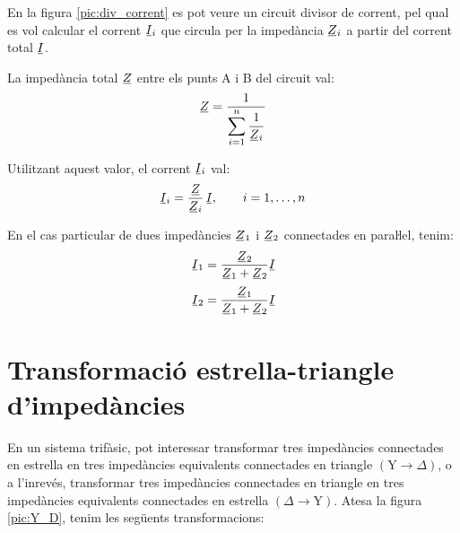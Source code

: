En la figura \vref{pic:div_corrent} es pot veure un circuit divisor
de corrent, pel qual es vol calcular el corrent $\cmplx{I}_i$ que
circula per la impedància $\cmplx{Z}_i$ a partir del corrent total
$\cmplx{I}$.
\begin{center}
	\centering
    
    \label{pic:div_corrent}
\end{center}

La impedància total $\cmplx{Z}$ entre els punts A i B del circuit val:
\begin{equation}\label{eq:z_parallel}
    \cmplx{Z} = \frac{1}{\displaystyle\sum_{i=1}^n \frac{1}{\cmplx{Z}_i}}
\end{equation}

Utilitzant aquest valor, el corrent $\cmplx{I}_i$ val:
\begin{equation}
    \cmplx{I}_i = \frac{\cmplx{Z}}{\cmplx{Z}_i}\,\cmplx{I}, \qquad i=1,\dots,n\label{eq:div_corrent}
\end{equation}

En el cas particular de dues impedàncies $\cmplx{Z}_1$ i $\cmplx{Z}_2$ connectades en paraŀlel, tenim:
\begin{subequations}
\begin{align}
    \cmplx{I}_1 &= \frac{\cmplx{Z}_2}{\cmplx{Z}_1+\cmplx{Z}_2} \cmplx{I}  \\[0.5ex]
    \cmplx{I}_2 &= \frac{\cmplx{Z}_1}{\cmplx{Z}_1+\cmplx{Z}_2} \cmplx{I}
\end{align}
\end{subequations}


\section{Transformació estrella-triangle d'impedàncies}\label{secc:d_y} 

En un sistema trifàsic, pot interessar transformar tres impedàncies connectades en
estrella en tres impedàncies equivalents connectades en triangle
$(\text{Y}\rightarrow\Delta)$, o a l'inrevés, transformar tres impedàncies connectades en
triangle en tres impedàncies equivalents connectades en estrella
$(\Delta\rightarrow\text{Y})$. Atesa la figura \vref{pic:Y_D}, tenim les següents
transformacions:

